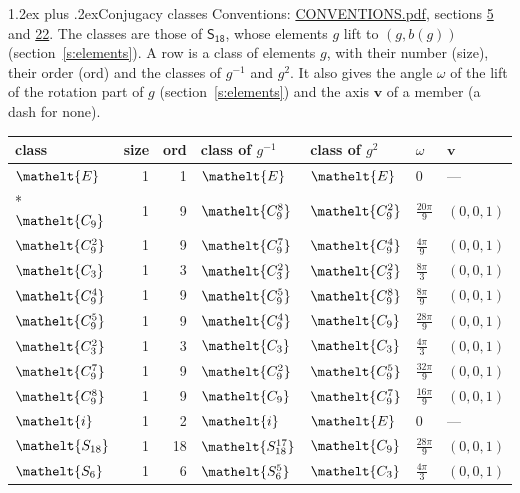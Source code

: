 \documentclass[10pt,a4paper]{article}
\makeatletter
\renewcommand\section{\@startsection{section}{1}{\z@}{-3ex plus -1ex minus -.2ex}%
  {1.2ex plus .2ex}{\normalfont\large\sffamily\bfseries\color{parttitle}}}
\numberwithin{equation}{section}
\newcommand{\eltfont}[1]{{\let\sigma\eltsigma\mathelt{#1}}}
\newcommand{\grp}[1]{\mathsf{#1}}
\newcommand{\cls}[1]{\eltfont{#1}}
\newcommand{\dirvec}[3]{(#1, #2, #3)}
\newcommand{\vv}{\mathbf{v}}
\makeatother
\begin{document}
\section{Conjugacy classes}\label{s:classes}
Conventions: \href{../../CONVENTIONS.pdf}{CONVENTIONS.pdf}, sections \href{../../../rotation/CONVENTIONS.pdf\#conv.5}{5} and \href{../../CONVENTIONS.pdf\#conv.22}{22}.
The classes are those of $\grp{S_{18}}$, whose elements $g$ lift to $(g, b(g))$ (section~\ref{s:elements}).
\leavevmode\label{n:head.size}\label{n:head.classof}A row is a class of elements $g$, with their number (size), their order (ord) and the classes of $g^{-1}$ and $g^{2}$. It also gives the angle $\omega$ of the lift of the rotation part of $g$ (section~\ref{s:elements}) and the axis $\vv$ of a member (a dash for none).
{\renewcommand{\arraystretch}{1.3}\begin{longtable}{@{}lrrllll@{}}\toprule
class & size & ord & class of $g^{-1}$ & class of $g^{2}$ & $\omega$ & $\vv$\\\midrule\endhead
\bottomrule\endfoot\endlastfoot
$\cls{E}$ & 1 & 1 & $\cls{E}$ & $\cls{E}$ & $0$ & ---\\*
$\cls{C_{9}}$ & 1 & 9 & $\cls{C_{9}^{8}}$ & $\cls{C_{9}^{2}}$ & $\tfrac{20\pi}{9}$ & $\dirvec{0}{0}{1}$\\
$\cls{C_{9}^{2}}$ & 1 & 9 & $\cls{C_{9}^{7}}$ & $\cls{C_{9}^{4}}$ & $\tfrac{4\pi}{9}$ & $\dirvec{0}{0}{1}$\\
$\cls{C_{3}}$ & 1 & 3 & $\cls{C_{3}^{2}}$ & $\cls{C_{3}^{2}}$ & $\tfrac{8\pi}{3}$ & $\dirvec{0}{0}{1}$\\
$\cls{C_{9}^{4}}$ & 1 & 9 & $\cls{C_{9}^{5}}$ & $\cls{C_{9}^{8}}$ & $\tfrac{8\pi}{9}$ & $\dirvec{0}{0}{1}$\\
$\cls{C_{9}^{5}}$ & 1 & 9 & $\cls{C_{9}^{4}}$ & $\cls{C_{9}}$ & $\tfrac{28\pi}{9}$ & $\dirvec{0}{0}{1}$\\
$\cls{C_{3}^{2}}$ & 1 & 3 & $\cls{C_{3}}$ & $\cls{C_{3}}$ & $\tfrac{4\pi}{3}$ & $\dirvec{0}{0}{1}$\\
$\cls{C_{9}^{7}}$ & 1 & 9 & $\cls{C_{9}^{2}}$ & $\cls{C_{9}^{5}}$ & $\tfrac{32\pi}{9}$ & $\dirvec{0}{0}{1}$\\
$\cls{C_{9}^{8}}$ & 1 & 9 & $\cls{C_{9}}$ & $\cls{C_{9}^{7}}$ & $\tfrac{16\pi}{9}$ & $\dirvec{0}{0}{1}$\\
$\cls{i}$ & 1 & 2 & $\cls{i}$ & $\cls{E}$ & $0$ & ---\\
$\cls{S_{18}}$ & 1 & 18 & $\cls{S_{18}^{17}}$ & $\cls{C_{9}}$ & $\tfrac{28\pi}{9}$ & $\dirvec{0}{0}{1}$\\
$\cls{S_{6}}$ & 1 & 6 & $\cls{S_{6}^{5}}$ & $\cls{C_{3}}$ & $\tfrac{4\pi}{3}$ & $\dirvec{0}{0}{1}$\\

\end{longtable}}
\end{document}
